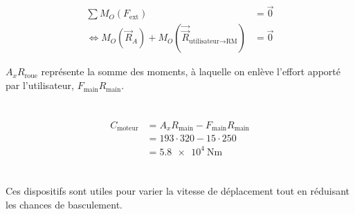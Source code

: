 \documentclass{article}
\begin{document}
\section{}

\begin{equation*}
  \begin{split}
    \sum M_O(F_\text{ext}) &= \vec 0 \\
    \iff M_O(\vec R_A) + M_O(\vec \vec R_{\text{utilisateur}\to\text{RM}}) &= \vec 0
  \end{split}
\end{equation*}

$A_x R_\text{roue}$ représente la somme des moments, à laquelle on enlève l'effort apporté par l'utilisateur, $F_\text{main} R_\text{main}$.

\section{}

\begin{equation*}
  \begin{split}
    C_\text{moteur} &= A_x R_\text{main} - F_\text{main} R_\text{main} \\
    &= 193 \cdot 320 - 15 \cdot 250 \\
    &= \SI{5.8e4}{\newton\meter}
  \end{split}
\end{equation*}

\section{}

Ces dispositifs sont utiles pour varier la vitesse de déplacement tout en réduisant les chances de basculement.
\end{document}
